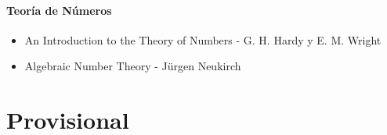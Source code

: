 \documentclass{article}
\begin{document}
\paragraph*{Teor\'ia de N\'umeros}
\begin{itemize}
	\item An Introduction to the Theory of Numbers - G. H. Hardy y E. M. Wright
	\item Algebraic Number Theory - J\"urgen Neukirch
\end{itemize}












\section*{Provisional}
\end{document}
